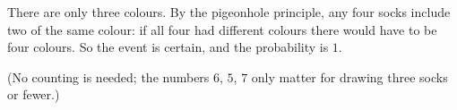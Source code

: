 There are only three colours. By the pigeonhole principle, any four socks include two of the same colour: if all four had different colours there would have to be four colours. So the event is certain, and the probability is $\boxed{1}$.

(No counting is needed; the numbers $6$, $5$, $7$ only matter for drawing three socks or fewer.)
